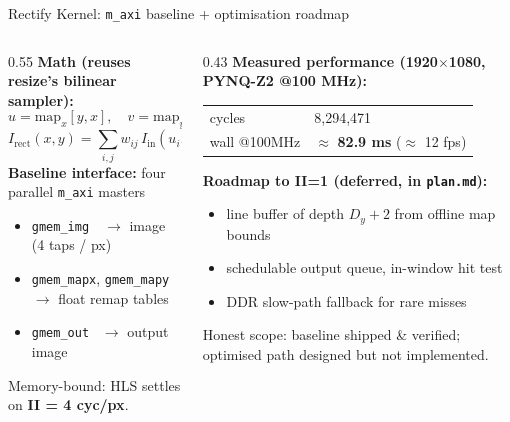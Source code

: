 \documentclass[aspectratio=169,10pt]{beamer}
\newcommand{\code}[1]{\texttt{\small #1}}
\newcommand{\hi}[1]{\textbf{#1}}
\begin{document}
\begin{frame}{Rectify Kernel: \code{m\_axi} baseline + optimisation roadmap}
  \begin{columns}[T,onlytextwidth]
    \begin{column}{0.55\textwidth}
      \textbf{Math (reuses resize's bilinear sampler):}
      \[
        u = \mathrm{map}_x[y,x],\quad v = \mathrm{map}_y[y,x]
      \]
      \[
        I_\text{rect}(x,y)=\sum_{i,j}w_{ij}\,I_\text{in}(u_i,v_j)
      \]
      \textbf{Baseline interface:} four parallel \code{m\_axi} masters
      \begin{itemize}\setlength{\itemsep}{0.15em}
        \item \code{gmem\_img} \,\, $\to$ image (4 taps / px)
        \item \code{gmem\_mapx}, \code{gmem\_mapy} $\to$ float remap tables
        \item \code{gmem\_out} \, $\to$ output image
      \end{itemize}
      Memory-bound: HLS settles on \hi{II = 4 cyc/px}.
    \end{column}
    \begin{column}{0.43\textwidth}
      \textbf{Measured performance (1920$\times$1080, PYNQ-Z2 @100 MHz):}\\[0.3em]
      \begin{tabular}{ll}
        \toprule
        cycles       & 8{,}294{,}471 \\
        wall @100MHz & $\approx$ \hi{82.9 ms} ($\approx$ 12 fps) \\
        \bottomrule
      \end{tabular}
      \vspace{0.6em}
      \textbf{Roadmap to II=1 (deferred, in \code{plan.md}):}
      \begin{itemize}\setlength{\itemsep}{0.1em}
        \item line buffer of depth $D_y{+}2$ from offline map bounds
        \item schedulable output queue, in-window hit test
        \item DDR slow-path fallback for rare misses
      \end{itemize}
      Honest scope: baseline shipped \& verified; optimised path designed
      but not implemented.
    \end{column}
  \end{columns}
\end{frame}
\end{document}
